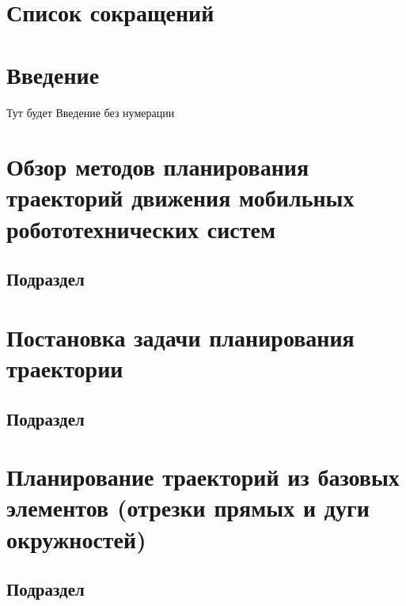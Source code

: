 \documentclass[russian, utf8, columnxxvi]{eskdtext}
\let\stdsection\section
\renewcommand\section{\newpage\stdsection}
\begin{document}
\thispagestyle{empty}

\thispagestyle{empty}


\setcounter{secnumdepth}{4}
\thispagestyle{empty}

\setcounter{page}{4}


\begin{center}
   \tableofcontents 
\end{center}


\section*{Список сокращений}
\section*{Введение}
Тут будет Введение без нумерации
\section{Обзор методов планирования траекторий движения мобильных робототехнических систем}
\subsection{Подраздел}
\section{Постановка задачи планирования траектории}
\subsection{Подраздел}
\section{Планирование траекторий из базовых элементов (отрезки прямых и дуги окружностей)}
\subsection{Подраздел}
\end{document}
